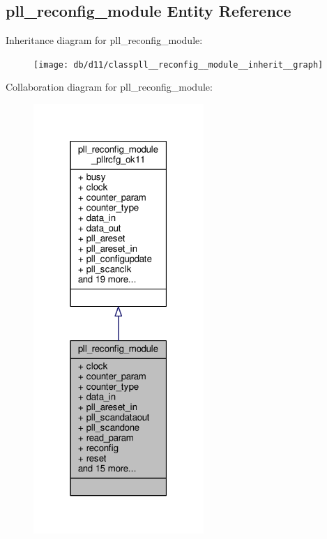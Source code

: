 \subsection{pll\+\_\+reconfig\+\_\+module Entity Reference}
\label{classpll__reconfig__module}


Inheritance diagram for pll\+\_\+reconfig\+\_\+module\+:\nopagebreak
\begin{figure}[H]
\begin{center}
\leavevmode
\texttt{[image: db/d11/classpll\_\_reconfig\_\_module\_\_inherit\_\_graph]}
\end{center}
\end{figure}


Collaboration diagram for pll\+\_\+reconfig\+\_\+module\+:\nopagebreak
\begin{figure}[H]
\begin{center}
\leavevmode
\includegraphics[width=183pt]{da/d0b/classpll__reconfig__module__coll__graph}
\end{center}
\end{figure}
